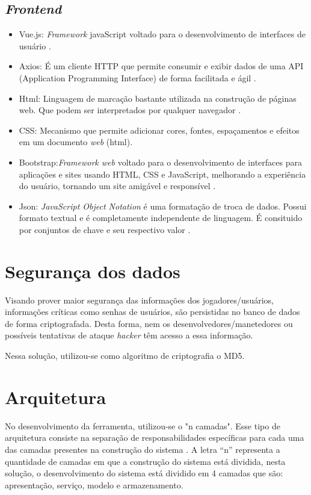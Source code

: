 \subsection{\textit{Frontend}}
\begin{itemize}
	\item Vue.js: \textit{Framework} javaScript voltado para o desenvolvimento de interfaces de usuário \cite{vue}.
	\item Axios: É um cliente HTTP que permite consumir e exibir dados de uma API (Application Programming Interface) de forma facilitada e ágil \cite{axios}.
	\item Html: Linguagem de marcação bastante utilizada na construção de páginas web. Que podem ser interpretados por 
		qualquer navegador \cite{html}.
	\item CSS: Mecanismo que permite adicionar cores, fontes, espaçamentos e efeitos em um documento \textit{web} (html). \cite{css}
	\item Bootstrap:\textit{Framework web} voltado para o desenvolvimento de interfaces para aplicações e sites usando HTML, CSS e JavaScript, melhorando
		a experiência do usuário, tornando um site amigável e responsível \cite{bootstrap}.
	\item Json: \textit{JavaScript Object Notation} é uma formatação de troca de dados. Possui formato textual e é completamente independente de linguagem. É
		consituido por conjuntos de chave e seu respectivo valor \cite{json}.
\end{itemize}

\section{Segurança dos dados}
Visando prover maior segurança das informações dos jogadores/usuários, informações críticas como senhas de usuários,
são persistidas no banco de dados de forma criptografada. Desta forma, nem os desenvolvedores/manetedores ou possíveis 
tentativas de ataque \textit{hacker} têm acesso a essa informação.

Nessa solução, utilizou-se como algoritmo de criptografia o MD5.

\section{Arquitetura}

No desenvolvimento da ferramenta, utilizou-se o "n camadas". Esse tipo
de arquitetura consiste na separação de responsabilidades específicas para cada uma das camadas presentes 
na construção do sistema \cite{MSF}. A letra ``n'' representa a quantidade de camadas em que a construção do sistema 
está dividida, nesta solução, o desenvolvimento do sistema está dividido em 4 camadas que são: apresentação, serviço, modelo
e armazenamento.

